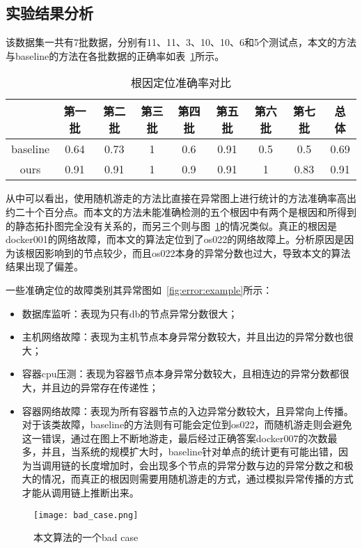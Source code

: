 \subsection{实验结果分析}
该数据集一共有7批数据，分别有11、11、3、10、10、6和5个测试点，本文的方法与baseline的方法在各批数据的正确率如表~\ref{tab:rca:result}所示。

\begin{table}[htbp]
  \centering
  \begin{tabular}{ccccccccc}
    \toprule
      & 第一批 & 第二批 & 第三批 & 第四批 & 第五批 &第六批 & 第七批& 总体\\
    \midrule
    baseline & 0.64 & 0.73 & 1& 0.6 & 0.91 & 0.5 &0.5  & 0.69\\
    ours &  0.91 & 0.91 & 1 & 0.9 & 0.91 &1 & 0.83 & 0.91\\
    \bottomrule
  \end{tabular}
  \caption{根因定位准确率对比}
  \label{tab:rca:result}
\end{table}

从中可以看出，使用随机游走的方法比直接在异常图上进行统计的方法准确率高出约二十个百分点。而本文的方法未能准确检测的五个根因中有两个是根因和所得到的静态拓扑图完全没有关系的，而另三个则与图~\ref{fig:bad:case}的情况类似。真正的根因是docker001的网络故障，而本文的算法定位到了os022的网络故障上。分析原因是因为该根因影响到的节点较少，而且os022本身的异常分数也过大，导致本文的算法结果出现了偏差。


一些准确定位的故障类别其异常图如~\ref{fig:error:example}所示：
\begin{itemize}
  \item 数据库监听：表现为只有db的节点异常分数很大；
  \item 主机网络故障：表现为主机节点本身异常分数较大，并且出边的异常分数也很大；
  \item 容器cpu压测：表现为容器节点本身异常分数较大，且相连边的异常分数都很大，并且边的异常存在传递性；
  \item 容器网络故障：表现为所有容器节点的入边异常分数较大，且异常向上传播。对于该类故障，baseline的方法则有可能会定位到os022，而随机游走则会避免这一错误，通过在图上不断地游走，最后经过正确答案docker007的次数最多，并且，当系统的规模扩大时，baseline针对单点的统计更有可能出错，因为当调用链的长度增加时，会出现多个节点的异常分数与边的异常分数之和极大的情况，而真正的根因则需要用随机游走的方式，通过模拟异常传播的方式才能从调用链上推断出来。
\end{itemize}
\begin{figure}[htbp]
  \centering
  \texttt{[image: bad\_case.png]}
  \caption{本文算法的一个bad case}
  \label{fig:bad:case}
\end{figure}

